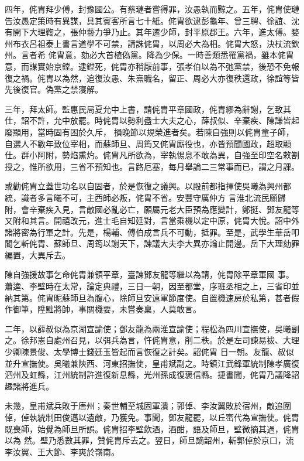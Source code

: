 \begin{pinyinscope}
 四年，侂胄拜少傅，封豫國公。有蔡璉者嘗得罪，汝愚執而黥之。五年，侂胄使璉告汝愚定策時有異謀，具其賓客所言七十紙。侂胄欲逮彭龜年、曾三聘、徐誼、沈有開下大理鞫之，張仲藝力爭乃止。其年遷少師，封平原郡王。六年，進太傅。婺州布衣呂祖泰上書言道學不可禁，請誅侂胄，以周必大為相。侂胄大怒，決杖流欽州。言者希
 侂胄意，劾必大首植偽黨。降為少保。一時善類悉罹黨禍，雖本侂胄意，而謀實始京鏜。逮鏜死，侂胄亦稍厭前事，張孝伯以為不弛黨禁，後恐不免報復之禍。侂胄以為然，追復汝愚、朱熹職名，留正、周必大亦復秩還政，徐誼等皆先後復官。偽黨之禁寖解。



 三年，拜太師。監惠民局夏允中上書，請侂胄平章國政，侂胄繆為辭謝，乞致其仕，詔不許，允中放罷。時侂胄以勢利蠱士大夫之心，薛叔似、辛棄疾、陳謙皆起廢顯用，當時固有困於久斥，
 損晚節以規榮進者矣。若陳自強則以侂胄童子師，自選人不數年致位宰相，而蘇師旦、周筠又侂胄廝役也，亦皆預聞國政，超取顯仕。群小阿附，勢焰熏灼。侂胄凡所欲為，宰執惕息不敢為異，自強至印空名敕劄授之，惟所欲用，三省不預知也。言路厄塞，每月舉論二三常事而已，謂之月課。



 或勸侂胄立蓋世功名以自固者，於是恢復之議興。以殿前都指揮使吳曦為興州都統，識者多言曦不可，主西師必叛，侂胄不省。安豐守厲仲方
 言淮北流民願歸附，會辛棄疾入見，言敵國必亂必亡，願屬元老大臣預為應變計，鄭挺、鄧友龍等又附和其言。開禧改元，進士毛自知廷對，言當乘機以定中原，侂胄大悅。詔中外諸將密為行軍之計。先是，楊輔、傅伯成言兵不可動，抵罪。至是，武學生華岳叩閽乞斬侂胄、蘇師旦、周筠以謝天下，諫議大夫李大異亦論止開邊。岳下大理劾罪編置，大異斥去。



 陳自強援故事乞命侂胄兼領平章，臺諫鄧友龍等繼以為請，侂胄除平章軍國
 事。蕭逵、李壁時在太常，論定典禮，三日一朝，因至都堂，序班丞相之上，三省印並納其第。侂胄昵蘇師旦為腹心，除師旦安遠軍節度使。自置機速房於私第，甚者假作御筆，陞黜將帥，事關機要，未嘗奏稟，人莫敢言。



 二年，以薛叔似為京湖宣諭使；鄧友龍為兩淮宣諭使；程松為四川宣撫使，吳曦副之。徐邦憲自處州召見，以弭兵為言，忤侂胄意，削二秩。於是左司諫易袚、大理少卿陳景俊、太學博士錢廷玉皆起而言恢復之計矣。詔侂胄
 日一朝。友龍、叔似並升宣撫使。吳曦兼陝西、河東招撫使，皇甫斌副之。時鎮江武鋒軍統制陳孝廣復泗州及虹縣，江州統制許進復新息縣，光州孫成復褒信縣。捷書聞，侂胄乃議降詔趣諸將進兵。



 未幾，皇甫斌兵敗于唐州；秦世輔至城固軍潰；郭倬、李汝翼敗於宿州，敵追圍倬，倬執統制田俊邁以遺敵，乃獲免。事聞，鄧友龍罷，以丘崈代為宣撫使。侂胄既喪師，始覺為師旦所誤。侂胄招李壁飲酒，酒酣，語及師旦，壁微摘其過，侂胄以為
 然。壁乃悉數其罪，贊侂胄斥去之。翌日，師旦謫韶州，斬郭倬於京口，流李汝翼、王大節、李爽於嶺南。




\end{pinyinscope}
